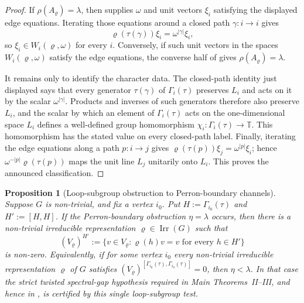 \documentclass[11pt,a4paper]{amsart}
\theoremstyle{plain}
\newtheorem{proposition}[theorem]{Proposition}
\theoremstyle{definition}
\theoremstyle{remark}
\DeclareMathOperator{\Irr}{Irr}
\newcommand{\TT}{\mathbb{T}}
\begin{document}
\begin{proof}
  If \(\rho(A_\varrho)=\lambda\), then
   supplies \(\omega\) and unit vectors
  \(\xi_i\) satisfying the displayed edge equations. Iterating those
  equations around a closed path \(\gamma:i\to i\) gives
  \[
    \varrho(\tau(\gamma))\xi_i=\omega^{|\gamma|}\xi_i,
  \]
  so \(\xi_i\in W_i(\varrho,\omega)\) for every \(i\). Conversely, if such
  unit vectors in the spaces \(W_i(\varrho,\omega)\) satisfy the edge
  equations, the converse half of  gives
  \(\rho(A_\varrho)=\lambda\).

  It remains only to identify the character data. The closed-path identity
  just displayed says that every generator \(\tau(\gamma)\) of
  \(\Gamma_i(\tau)\) preserves \(L_i\) and acts on it by the scalar
  \(\omega^{|\gamma|}\). Products and inverses of such generators therefore
  also preserve \(L_i\), and the scalar by which an element of
  \(\Gamma_i(\tau)\) acts on the one-dimensional space \(L_i\) defines a
  well-defined group homomorphism \(\chi_i:\Gamma_i(\tau)\to\TT\). This
  homomorphism has the stated value on every closed-path label. Finally,
  iterating the edge equations along a path \(p:i\to j\) gives
  \(\varrho(\tau(p))\xi_j=\omega^{|p|}\xi_i\); hence
  \(\omega^{-|p|}\varrho(\tau(p))\) maps the unit line \(L_j\) unitarily
  onto \(L_i\). This proves the announced classification.
\end{proof}

\begin{proposition}[Loop-subgroup obstruction to Perron-boundary channels]
  \label{prop:eta-gap-loop-subgroup-obstruction}
  Suppose \(G\) is non-trivial, and fix a vertex \(i_0\).  Put
  \(H:=\Gamma_{i_0}(\tau)\) and \(H':=[H,H]\).  If the Perron-boundary
  obstruction \(\eta=\lambda\) occurs, then there is a non-trivial
  irreducible representation \(\varrho\in\Irr(G)\) such that
  \[
    (V_\varrho)^{H'}
    :=
    \{v\in V_\varrho:\varrho(h)v=v\text{ for every }h\in H'\}
  \]
  is non-zero.  Equivalently, if for some vertex \(i_0\) every
  non-trivial irreducible representation \(\varrho\) of \(G\) satisfies
  \((V_\varrho)^{[\Gamma_{i_0}(\tau),\Gamma_{i_0}(\tau)]}=0\), then
  \(\eta<\lambda\).  In that case the strict twisted spectral-gap
  hypothesis required in Main Theorems~II--III, and hence in
  , is
  certified by this single loop-subgroup test.
\end{proposition}
\end{document}
